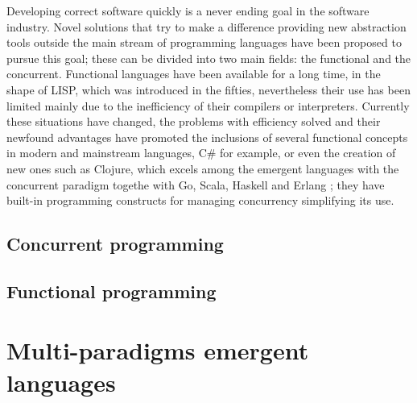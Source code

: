 \documentclass[a4paper]{llncs}
\begin{document}
Developing correct software quickly is a never ending goal in the
software industry. Novel solutions that try to make a difference
providing new abstraction tools outside the main stream of
programming languages have been
proposed to pursue this goal;  these can be divided into two main
fields: the functional and the concurrent. Functional languages have been
available for a long time, in the shape of LISP, which was introduced
in the fifties, 
nevertheless their use has been limited mainly due to the inefficiency of
their compilers or interpreters. Currently these situations have
changed, the problems with efficiency solved and their newfound advantages have promoted the
inclusions of several functional concepts in modern and mainstream
languages, C\# for example, or even the creation of new ones
such as Clojure, which excels among the emergent languages with the
concurrent paradigm togethe with Go, Scala, Haskell and Erlang
\cite{DiPierro:2012:CMP}; they have built-in programming constructs
for managing concurrency simplifying its use.



\subsection{Concurrent programming}
    

\subsection{Functional programming}
    

\section{Multi-paradigms emergent languages}
\label{sec:emergentes}
    

%    
%
%    
%
%    
\end{document}
